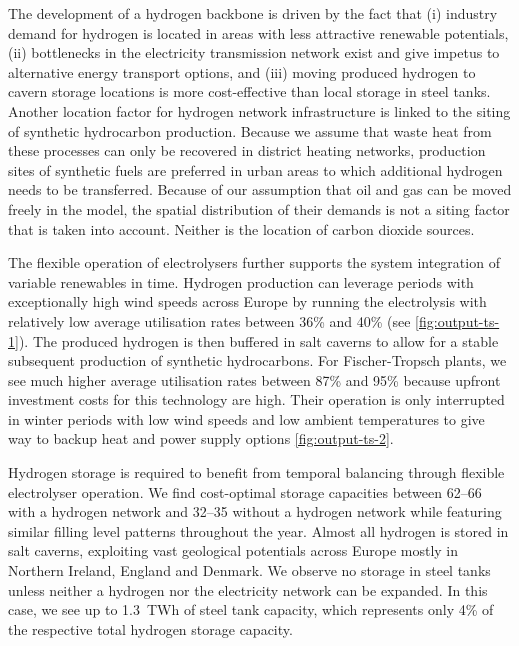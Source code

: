 
The development of a hydrogen backbone is driven by the fact that (i) industry
demand for hydrogen is located in areas with less attractive renewable
potentials, (ii) bottlenecks in the electricity transmission network exist and
give impetus to alternative energy transport options, and (iii) moving produced
hydrogen to cavern storage locations is more cost-effective than local storage
in steel tanks. Another location factor for hydrogen network infrastructure is
linked to the siting of synthetic hydrocarbon production. Because we assume that
waste heat from these processes can only be recovered in district heating
networks, production sites of synthetic fuels are preferred in urban areas to
which additional hydrogen needs to be transferred. Because of our assumption
that oil and gas can be moved freely in the model, the spatial distribution of
their demands is not a siting factor that is taken into account. Neither is the
location of carbon dioxide sources.


The flexible operation of electrolysers further supports the system integration
of variable renewables in time. Hydrogen production can leverage periods with
exceptionally high wind speeds across Europe by running the electrolysis with
relatively low average utilisation rates between 36\% and 40\% (see
\cref{fig:output-ts-1}). The produced hydrogen is then buffered in salt caverns
to allow for a stable subsequent production of synthetic hydrocarbons. For
Fischer-Tropsch plants, we see much higher average utilisation rates between
87\% and 95\% because upfront investment costs for this technology are high.
Their operation is only interrupted in winter periods with low wind speeds and
low ambient temperatures to give way to backup heat and power supply options
\cref{fig:output-ts-2}.


Hydrogen storage is required to benefit from temporal balancing through flexible
electrolyser operation. We find cost-optimal storage capacities between
\SIrange{62}{66}{\twh} with a hydrogen network and \SIrange{32}{35}{\twh}
without a hydrogen network while featuring similar filling level patterns
throughout the year. Almost all hydrogen is stored in salt caverns, exploiting
vast geological potentials across Europe mostly in Northern Ireland, England and
Denmark. We observe no storage in steel tanks unless neither a hydrogen nor the
electricity network can be expanded. In this case, we see up to 1.3~TWh of steel
tank capacity, which represents only 4\% of the respective total hydrogen
storage capacity.

